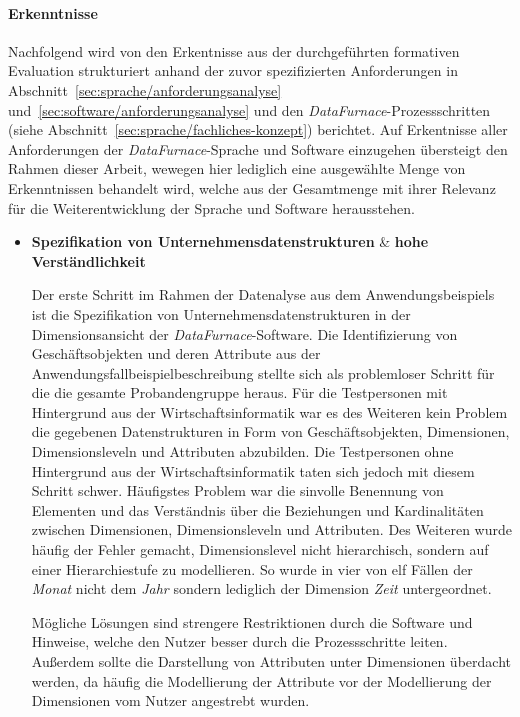 \documentclass[
  language=german, %
  type=bachelor,%
  ngerman
]{isthesis}
\begin{document}
\begin{content}
\paragraph{Erkenntnisse} Nachfolgend wird von den Erkentnisse aus der
durchgeführten formativen Evaluation strukturiert anhand der zuvor
spezifizierten Anforderungen in Abschnitt~\ref{sec:sprache/anforderungsanalyse}
und~\ref{sec:software/anforderungsanalyse} und den
\textit{DataFurnace}-Prozessschritten (siehe
Abschnitt~\ref{sec:sprache/fachliches-konzept}) berichtet. Auf Erkentnisse
aller Anforderungen der \textit{DataFurnace}-Sprache und Software einzugehen
übersteigt den Rahmen dieser Arbeit, wewegen hier lediglich eine ausgewählte
Menge von Erkenntnissen behandelt wird, welche aus der Gesamtmenge mit ihrer
Relevanz für die Weiterentwicklung der Sprache und Software herausstehen.

\begin{itemize}
  \item \textbf{Spezifikation von Unternehmensdatenstrukturen} \& \textbf{hohe Verständlichkeit}

    Der erste Schritt im Rahmen der Datenalyse aus dem Anwendungsbeispiels ist
    die Spezifikation von Unternehmensdatenstrukturen in der Dimensionsansicht
    der \textit{DataFurnace}-Software. Die Identifizierung von
    Geschäftsobjekten und deren Attribute aus der
    Anwendungsfallbeispielbeschreibung stellte sich als problemloser Schritt
    für die die gesamte Probandengruppe heraus. Für die Testpersonen mit
    Hintergrund aus der Wirtschaftsinformatik war es des Weiteren kein Problem
    die gegebenen Datenstrukturen in Form von Geschäftsobjekten, Dimensionen,
    Dimensionsleveln und Attributen abzubilden. Die Testpersonen ohne
    Hintergrund aus der Wirtschaftsinformatik taten sich jedoch mit diesem
    Schritt schwer. Häufigstes Problem war die sinvolle Benennung von Elementen
    und das Verständnis über die Beziehungen und Kardinalitäten zwischen
    Dimensionen, Dimensionsleveln und Attributen. Des Weiteren wurde häufig der
    Fehler gemacht, Dimensionslevel nicht hierarchisch, sondern auf einer
    Hierarchiestufe zu modellieren. So wurde in vier von elf Fällen
    der \textit{Monat} nicht dem \textit{Jahr} sondern lediglich der Dimension
    \textit{Zeit} untergeordnet. 
    
    Mögliche Lösungen sind strengere Restriktionen durch die
    Software und Hinweise, welche den Nutzer besser durch die Prozessschritte
    leiten. Außerdem sollte die Darstellung von Attributen unter Dimensionen
    überdacht werden, da häufig die Modellierung der Attribute vor der
    Modellierung der Dimensionen vom Nutzer angestrebt wurden.


\end{itemize}
\end{content}
\end{document}
